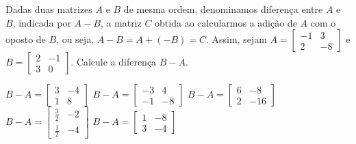 Dadas duas matrizes $A$ e $B$ de mesma ordem, denominamos diferença entre $A$ e $B$, indicada por $A-B$, a matriz $C$ obtida ao calcularmos a adição de $A$ com o oposto de $B$, ou seja, $A-B=A+(-B)=C$. Assim, sejam $A = \left[\begin{array}{cc}
-1 & 3 \\
2 & -8
\end{array}\right]$ e $B = \left[\begin{array}{cc}
2 & -1 \\
3 & 0
\end{array}\right]$. Calcule a diferença $B-A$.

$B-A = \left[\begin{array}{cc} 3 & -4 \\ 1 & 8 \end{array}\right]$
$B-A = \left[\begin{array}{cc} -3 & 4 \\ -1 & -8 \end{array}\right]$
$B-A = \left[\begin{array}{cc} 6 & -8 \\ 2 & -16 \end{array}\right]$
$B-A = \left[\begin{array}{cc} \frac{3}{2} & -2 \\ \frac{1}{2} & -4 \end{array}\right]$
$B-A = \left[\begin{array}{cc}  1 & -8 \\  3 & -4 \end{array}\right]$


